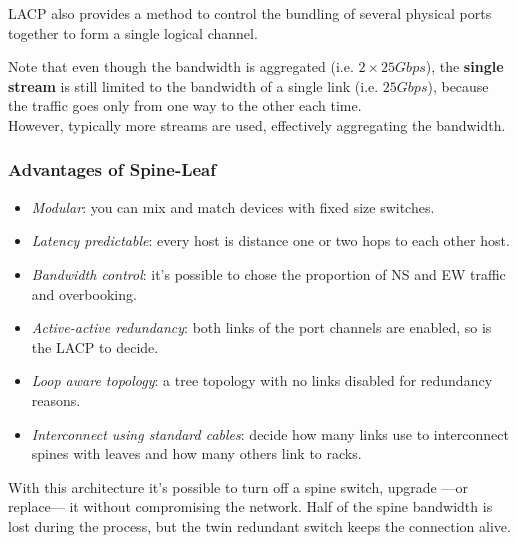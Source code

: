 LACP also provides a method to control the bundling of several physical ports together to form a single logical channel.

Note that even though the bandwidth is aggregated (i.e. $2\times 25Gbps$), the \textbf{single stream} is still limited to the bandwidth of a single link (i.e. $25Gbps$), because the traffic goes only from one way to the other each time.\\
However, typically more streams are used, effectively aggregating the bandwidth.

\subsubsection{Advantages of Spine-Leaf}

\begin{itemize}
   \item \textit{Modular}: you can mix and match devices with fixed size switches.
   \item \textit{Latency predictable}: every host is distance one or two hops to each other host.
   \item \textit{Bandwidth control}: it's possible to chose the proportion of NS and EW traffic and overbooking.
   \item \textit{Active-active redundancy}:  both links of the port channels are enabled, so is the LACP to decide.
   \item \textit{Loop aware topology}: a tree topology with no links disabled for redundancy reasons.
   \item \textit{Interconnect using standard cables}: decide how many links use to interconnect spines with leaves and how many others link to racks.
   
\end{itemize}
With this architecture it’s possible to turn off a spine switch, upgrade ---or replace--- it without compromising the network. Half of the spine bandwidth is lost during the process, but the twin redundant switch keeps the connection alive.

